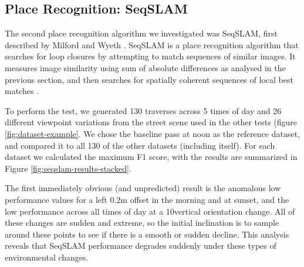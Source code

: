 \documentclass[letterpaper, 10 pt, conference]{ieeeconf}  %
\begin{document}



\subsection{Place Recognition: SeqSLAM}

The second place recognition algorithm we investigated was SeqSLAM, first described by Milford and Wyeth \cite{Milford2012}. SeqSLAM is a place recognition algorithm that searches for loop closures by attempting to match sequences of similar images. It measures image similarity using sum of absolute differences as analysed in the previous section, and then searches for spatially coherent sequences of local best matches \cite{Milford2012}.

To perform the test, we generated 130 traverses across 5 times of day and 26 different viewpoint variations from the street scene used in the other tests (figure \ref{fig:dataset-example}. We chose the baseline pass at noon as the reference dataset, and compared it to all 130 of the other datasets (including itself). For each dataset we calculated the maximum F1 score, with the results are summarized in Figure \ref{fig:seqslam-results-stacked}.

The first immediately obvious (and unpredicted) result is the anomalous low performance values for a left 0.2m offset in the morning and at sunset, and the low performance across all times of day at a 10\degree vertical orientation change.  All of these changes are sudden and extreme, so the initial inclination is to sample around these points to see if there is a smooth or sudden decline. This analysis reveals that SeqSLAM performance degrades suddenly under these types of environmental changes. 
\end{document}

